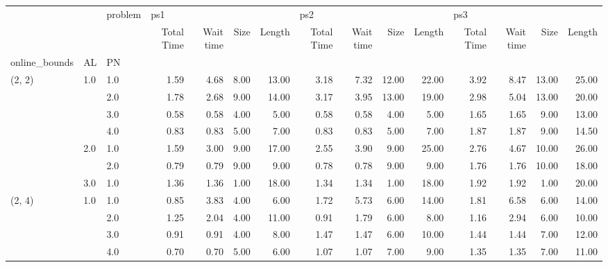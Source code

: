 \begin{tabular}{lllrrrrrrrrrrrr}
\toprule
       &     & problem & \multicolumn{4}{l}{ps1} & \multicolumn{4}{l}{ps2} & \multicolumn{4}{l}{ps3} \\
       &     & {} & Total Time & Wait time & Size & Length & Total Time & Wait time &  Size & Length & Total Time & Wait time &  Size & Length \\
online\_bounds & AL & PN &            &           &      &        &            &           &       &        &            &           &       &        \\
\midrule
(2, 2) & 1.0 & 1.0  &       1.59 &      4.68 & 8.00 &  13.00 &       3.18 &      7.32 & 12.00 &  22.00 &       3.92 &      8.47 & 13.00 &  25.00 \\
       &     & 2.0  &       1.78 &      2.68 & 9.00 &  14.00 &       3.17 &      3.95 & 13.00 &  19.00 &       2.98 &      5.04 & 13.00 &  20.00 \\
       &     & 3.0  &       0.58 &      0.58 & 4.00 &   5.00 &       0.58 &      0.58 &  4.00 &   5.00 &       1.65 &      1.65 &  9.00 &  13.00 \\
       &     & 4.0  &       0.83 &      0.83 & 5.00 &   7.00 &       0.83 &      0.83 &  5.00 &   7.00 &       1.87 &      1.87 &  9.00 &  14.50 \\
       & 2.0 & 1.0  &       1.59 &      3.00 & 9.00 &  17.00 &       2.55 &      3.90 &  9.00 &  25.00 &       2.76 &      4.67 & 10.00 &  26.00 \\
       &     & 2.0  &       0.79 &      0.79 & 9.00 &   9.00 &       0.78 &      0.78 &  9.00 &   9.00 &       1.76 &      1.76 & 10.00 &  18.00 \\
       & 3.0 & 1.0  &       1.36 &      1.36 & 1.00 &  18.00 &       1.34 &      1.34 &  1.00 &  18.00 &       1.92 &      1.92 &  1.00 &  20.00 \\
(2, 4) & 1.0 & 1.0  &       0.85 &      3.83 & 4.00 &   6.00 &       1.72 &      5.73 &  6.00 &  14.00 &       1.81 &      6.58 &  6.00 &  14.00 \\
       &     & 2.0  &       1.25 &      2.04 & 4.00 &  11.00 &       0.91 &      1.79 &  6.00 &   8.00 &       1.16 &      2.94 &  6.00 &  10.00 \\
       &     & 3.0  &       0.91 &      0.91 & 4.00 &   8.00 &       1.47 &      1.47 &  6.00 &  10.00 &       1.44 &      1.44 &  7.00 &  12.00 \\
       &     & 4.0  &       0.70 &      0.70 & 5.00 &   6.00 &       1.07 &      1.07 &  7.00 &   9.00 &       1.35 &      1.35 &  7.00 &  11.00 \\

\end{tabular}
